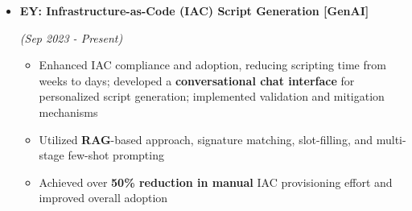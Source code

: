 \documentclass[a4paper,10pt]{article}
\newcommand{\isep}{-2 pt}
\begin{document}
\begin{itemize}
\item \textbf{EY: Infrastructure-as-Code (IAC) Script Generation [GenAI]}  \hfill {\emph{(Sep 2023 - Present)}\\[-0.6cm]
    \begin{itemize}\itemsep \isep
        \item Enhanced IAC compliance and adoption, reducing scripting time from weeks to days; developed a \textbf{conversational chat interface} for personalized script generation; implemented validation and mitigation mechanisms
        \item Utilized \textbf{RAG}-based approach, signature matching, slot-filling, and multi-stage few-shot prompting
        \item Achieved over \textbf{50\% reduction in manual} IAC provisioning effort and improved overall adoption
        
    
        

\end{itemize}}
\end{itemize}
\end{document}
